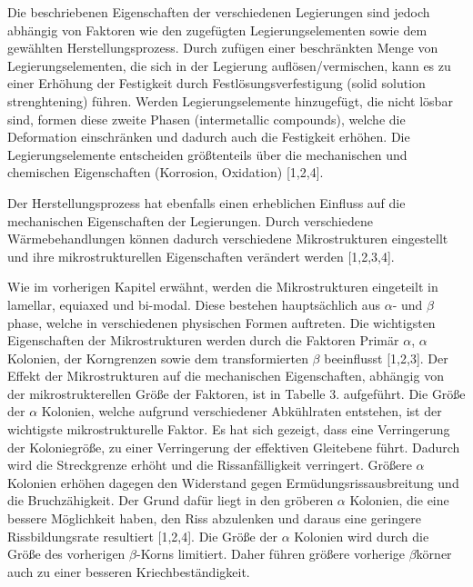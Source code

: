 Die beschriebenen Eigenschaften der verschiedenen Legierungen sind jedoch abhängig von Faktoren wie den zugefügten Legierungselementen sowie dem gewählten Herstellungsprozess.
Durch zufügen einer beschränkten Menge von Legierungselementen, die sich in der Legierung auflösen/vermischen, kann es zu einer Erhöhung der Festigkeit durch Festlösungsverfestigung (solid solution strenghtening) führen. Werden Legierungselemente hinzugefügt, die nicht lösbar sind, formen diese zweite Phasen (intermetallic compounds), welche die Deformation einschränken und dadurch auch die Festigkeit erhöhen. Die Legierungselemente entscheiden größtenteils über die mechanischen und chemischen Eigenschaften (Korrosion, Oxidation) [1,2,4].

Der Herstellungsprozess hat ebenfalls einen erheblichen Einfluss auf die mechanischen Eigenschaften der Legierungen. Durch verschiedene Wärmebehandlungen können dadurch verschiedene Mikrostrukturen eingestellt und ihre mikrostrukturellen Eigenschaften verändert werden [1,2,3,4].

Wie im vorherigen Kapitel erwähnt, werden die Mikrostrukturen eingeteilt in lamellar, equiaxed und bi-modal. Diese bestehen hauptsächlich aus $\alpha$- und $\beta$phase, welche in verschiedenen physischen Formen auftreten. Die wichtigsten Eigenschaften der Mikrostrukturen werden durch die Faktoren Primär $\alpha$, $\alpha$ Kolonien, der Korngrenzen sowie dem transformierten $\beta$ beeinflusst [1,2,3]. Der Effekt der Mikrostrukturen auf die mechanischen Eigenschaften, abhängig von der mikrostrukterellen Größe der Faktoren, ist in Tabelle 3. aufgeführt. Die Größe der $\alpha$ Kolonien, welche aufgrund verschiedener Abkühlraten entstehen, ist der wichtigste mikrostrukturelle Faktor. Es hat sich gezeigt, dass eine Verringerung der Koloniegröße, zu einer Verringerung der effektiven Gleitebene führt. Dadurch wird die Streckgrenze erhöht und die Rissanfälligkeit verringert. Größere $\alpha$ Kolonien erhöhen dagegen den Widerstand gegen Ermüdungsrissausbreitung und die Bruchzähigkeit. Der Grund dafür liegt in den gröberen $\alpha$ Kolonien, die eine bessere Möglichkeit haben, den Riss abzulenken und daraus eine geringere Rissbildungsrate resultiert [1,2,4]. Die Größe der $\alpha$ Kolonien wird durch die Größe des vorherigen $\beta$-Korns limitiert. Daher führen größere vorherige $\beta$körner auch zu einer besseren Kriechbeständigkeit.

